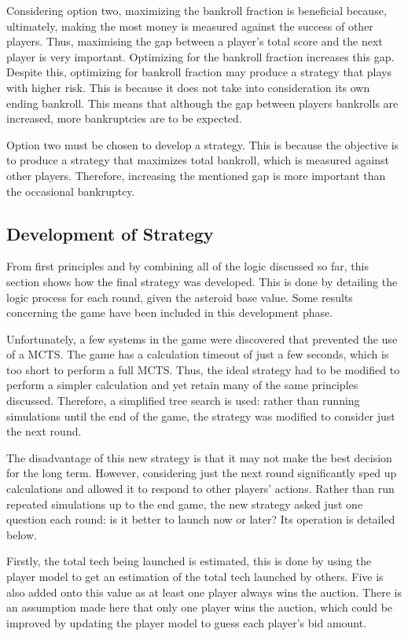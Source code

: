 \documentclass[11pt, twoside]{article}
\begin{document}
Considering option two, maximizing the bankroll fraction is beneficial because, ultimately, making the most money is measured against the success of other players. Thus, maximising the gap between a player's total score and the next player is very important. Optimizing for the bankroll fraction increases this gap. Despite this, optimizing for bankroll fraction may produce a strategy that plays with higher risk. This is because it does not take into consideration its own ending bankroll. This means that although the gap between players bankrolls are increased, more bankruptcies are to be expected.

Option two must be chosen to develop a strategy. This is because the objective is to produce a strategy that maximizes total bankroll, which is measured against other players. Therefore, increasing the mentioned gap is more important than the occasional bankruptcy.

\subsection{Development of Strategy} \label{SectionDEVSTRAT}

From first principles and by combining all of the logic discussed so far, this section shows how the final strategy was developed. This is done by detailing the logic process for each round, given the asteroid base value. Some results concerning the game have been included in this development phase.

Unfortunately, a few systems in the game were discovered that prevented the use of a MCTS. The game has a calculation timeout of just a few seconds, which is too short to perform a full MCTS. Thus, the ideal strategy had to be modified to perform a simpler calculation and yet retain many of the same principles discussed. Therefore, a simplified tree search is used: rather than running simulations until the end of the game, the strategy was modified to consider just the next round.

The disadvantage of this new strategy is that it may not make the best decision for the long term. However, considering just the next round significantly sped up calculations and allowed it to respond to other players' actions. Rather than run repeated simulations up to the end game, the new strategy asked just one question each round: is it better to launch now or later? Its operation is detailed below.

Firstly, the total tech being launched is estimated, this is done by using the player model to get an estimation of the total tech launched by others. Five is also added onto this value as at least one player always wins the auction. There is an assumption made here that only one player wins the auction, which could be improved by updating the player model to guess each player's bid amount.
\end{document}
